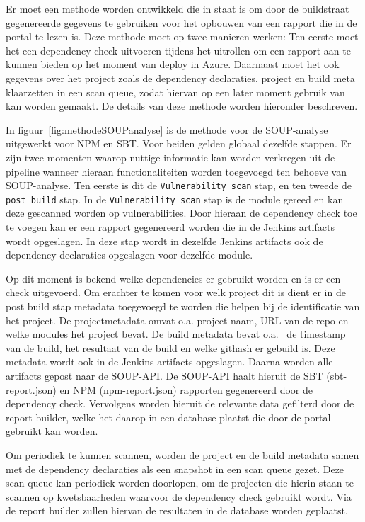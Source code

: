 Er moet een methode worden ontwikkeld die in staat is om door de buildstraat gegenereerde gegevens te gebruiken voor het opbouwen van een rapport die in de portal te lezen is.
Deze methode moet op twee manieren werken:
Ten eerste moet het een dependency check uitvoeren tijdens het uitrollen om een rapport aan te kunnen bieden op het moment van deploy in Azure. Daarnaast moet het ook gegevens over het project zoals de dependency declaraties, project en build meta klaarzetten in een scan queue, zodat hiervan op een later moment gebruik van kan worden gemaakt. De details van deze methode worden hieronder beschreven.

In figuur~\ref{fig:methodeSOUPanalyse} is de methode voor de SOUP-analyse uitgewerkt voor NPM en SBT. Voor beiden gelden globaal dezelfde stappen. Er zijn twee momenten waarop nuttige informatie kan worden verkregen uit de pipeline wanneer hieraan functionaliteiten worden toegevoegd ten behoeve van SOUP-analyse. Ten eerste is dit de \texttt{Vulnerability\_scan} stap, en ten tweede de \texttt{post\_build} stap. In de \texttt{Vulnerability\_scan} stap is de module gereed en kan deze gescanned worden op vulnerabilities. Door hieraan de dependency check toe te voegen kan er een rapport gegenereerd worden die in de Jenkins artifacts wordt opgeslagen. In deze stap wordt in dezelfde Jenkins artifacts ook de dependency declaraties opgeslagen voor dezelfde module.

Op dit moment is bekend welke dependencies er gebruikt worden en is er een check uitgevoerd. Om erachter te komen voor welk project dit is dient er in de post build stap metadata toegevoegd te worden die helpen bij de identificatie van het project. De projectmetadata omvat o.a. project naam, URL van de repo en welke modules het project bevat. De build metadata bevat o.a. \ de timestamp van de build, het resultaat van de build en welke githash er gebuild is. Deze metadata wordt ook in de Jenkins artifacts opgeslagen. Daarna worden alle artifacts gepost naar de SOUP-API.
De SOUP-API haalt hieruit de SBT (sbt-report.json) en NPM (npm-report.json) rapporten gegenereerd door de dependency check. Vervolgens worden hieruit de relevante data gefilterd door de report builder, welke het daarop in een database plaatst die door de portal gebruikt kan worden.


Om periodiek te kunnen scannen, worden de project en de build metadata samen met de dependency declaraties als een snapshot in een scan queue gezet. Deze scan queue kan periodiek worden doorlopen, om de projecten die hierin staan te scannen op kwetsbaarheden waarvoor de dependency check gebruikt wordt. Via de report builder zullen hiervan de resultaten in de database worden geplaatst.

